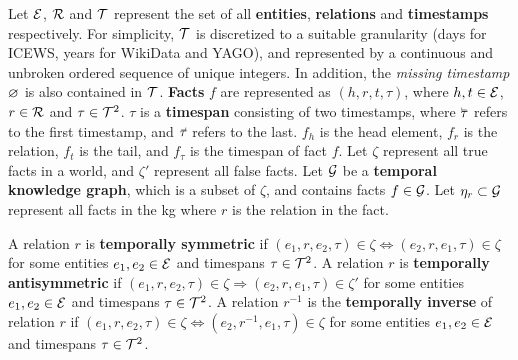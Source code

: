 

Let $\mathcal{E}$, $\mathcal{R}$ and $\mathcal{T}$ represent the set of all \textbf{entities}, \textbf{relations} and \textbf{timestamps} respectively. For simplicity, $\mathcal{T}$ is discretized to a suitable granularity (days for \mbox{ICEWS}, years for WikiData and YAGO), and represented by a continuous and unbroken ordered sequence of unique integers. In addition, the \textit{missing timestamp} $\varnothing$ is also contained in $\mathcal{T}$. \textbf{Facts} $f$ are represented as $(h, r, t, \tau)$, where $h, t \in \mathcal{E}$, $r \in \mathcal{R}$ and $\tau \in \mathcal{T}^2$. $\tau$ is a \textbf{timespan} consisting of two timestamps, where $\timebegin{\tau}$ refers to the first timestamp, and $\timeend{\tau}$ refers to the last. $f_h$ is the head element, $f_r$ is the relation, $f_t$ is the tail, and $f_\tau$ is the timespan of fact $f$. 
Let $\zeta$ represent all true facts in a world, and $\zeta'$ represent all false facts. Let $\mathcal{G}$ be a \textbf{temporal knowledge graph}, which is a subset of $\zeta$, and contains facts $f \in \mathcal{G}$. Let $\eta_r \subset \mathcal{G}$ represent all facts in the \gls{kg} where $r$ is the relation in the fact.



A relation $r$ is \textbf{temporally symmetric} if $(e_1, r, e_2, \tau) \in \zeta \Leftrightarrow (e_2, r, e_1, \tau) \in \zeta$ for some entities $e_1, e_2 \in \mathcal{E}$ and timespans $\tau \in \mathcal{T}^2$.
A relation $r$ is \textbf{temporally antisymmetric} if $(e_1, r, e_2, \tau) \in \zeta \Rightarrow (e_2, r, e_1, \tau) \in \zeta'$ for some entities $e_1, e_2 \in \mathcal{E}$ and timespans $\tau \in \mathcal{T}^2$.
A relation $r^{-1}$ is the \textbf{temporally inverse} of relation $r$ if $(e_1, r, e_2, \tau) \in \zeta \Leftrightarrow (e_2, r^{-1}, e_1, \tau) \in \zeta$ for some entities $e_1, e_2 \in \mathcal{E}$ and timespans $\tau \in \mathcal{T}^2$.

